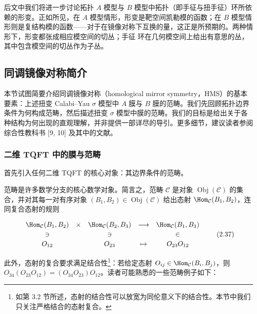 后文中我们将进一步讨论拓扑 $A$ 模型与 $B$ 模型中拓扑（即手征与扭手征）环所依赖的形变。正如所见，在 $A$ 模型情形，形变是靶空间凯勒模的函数；在 $B$ 模型情形则是复结构模的函数——对于在镜像对称下互换的量，这正是所预期的。两种情形下，形变都张成相应模空间的切丛；手征%
环在几何模空间上给出有意思的丛，其中包含模空间的切丛作为子丛。

\subsection{同调镜像对称简介}

本节试图简要介绍同调镜像对称（homological mirror symmetry，HMS）的基本要素：上述扭变 Calabi--Yau $\sigma$ 模型中 $A$ 膜与 $B$ 膜的范畴。我们先回顾拓扑边界条件为何构成范畴，然后描述扭变 $\sigma$ 模型中膜的范畴。我们的目标是给出关于各种结构为何出现的直观理解，并非提供一部详尽的导引。更多细节，建议读者参阅综合性教科书 [9, 10] 及其中的文献。

\subsubsection{二维 TQFT 中的膜与范畴}

首先引入任何二维 TQFT 的核心对象：其边界条件的范畴。

范畴是许多数学分支的核心数学对象。简言之，范畴 $\mathcal{C}$ 是对象 $\operatorname{Obj}(\mathcal{C})$ 的集合，并对其每一对有序对象 $(B_1,B_2)\in\operatorname{Obj}(\mathcal{C})$ 给出态射 $\Hom_{\mathcal{C}}(B_1,B_2)$，连同复合态射的规则

\begin{equation}
\begin{array}{c@{\quad}c@{\quad}c@{\quad}c@{\quad}c} \Hom_{\mathcal{C}}(B_1,B_2) & \times & \Hom_{\mathcal{C}}(B_2,B_3) & \longrightarrow & \Hom_{\mathcal{C}}(B_1,B_3)\\[2pt]
\ni & & \ni & & \in\\[2pt] O_{12} & & O_{23} & \mapsto & O_{23}O_{12}\end{array}\tag{2.37}
\end{equation}

此外，态射的复合要求满足结合性\footnote{如第 3.2 节所述，态射的结合性可以放宽为同伦意义下的结合性。本节中我们只关注严格结合的态射复合。}：若给定态射 $O_{ij}\in\Hom_{\mathcal{C}}(B_i,B_j)$，则 $O_{34}(O_{23}O_{12})=(O_{34}O_{23})O_{12}$。读者可能熟悉的一些范畴例子如下：

